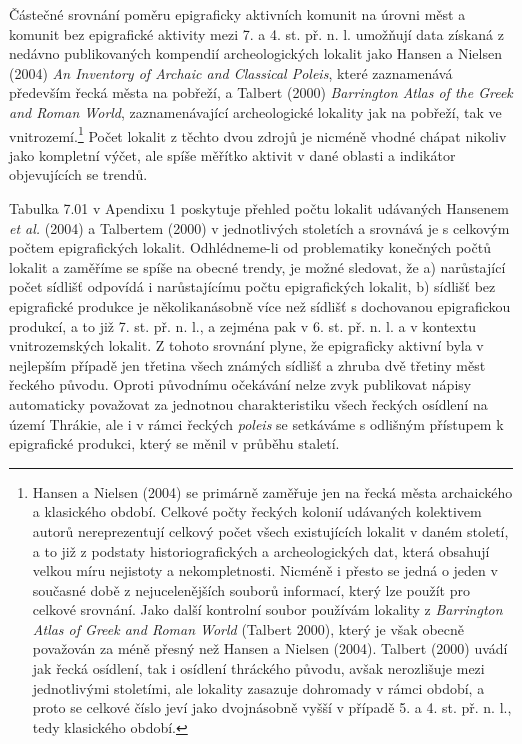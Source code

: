Částečné srovnání poměru epigraficky aktivních komunit na úrovni měst a komunit bez epigrafické aktivity mezi 7. a 4. st. př. n. l. umožňují data získaná z nedávno publikovaných kompendií archeologických lokalit jako Hansen a Nielsen (2004) {\em An Inventory of Archaic and Classical Poleis}, které zaznamenává především řecká města na pobřeží, a Talbert (2000) {\em Barrington Atlas of the Greek and Roman World}, zaznamenávající archeologické lokality jak na pobřeží, tak ve vnitrozemí.\footnote{Hansen a Nielsen (2004) se primárně zaměřuje jen na řecká města archaického a klasického období. Celkové počty řeckých kolonií udávaných kolektivem autorů nereprezentují celkový počet všech existujících lokalit v daném století, a to již z podstaty historiografických a archeologických dat, která obsahují velkou míru nejistoty a nekompletnosti. Nicméně i přesto se jedná o jeden v současné době z nejucelenějších souborů informací, který lze použít pro celkové srovnání. Jako další kontrolní soubor používám lokality z {\em Barrington Atlas of Greek and Roman World} (Talbert 2000), který je však obecně považován za méně přesný než Hansen a Nielsen (2004). Talbert (2000) uvádí jak řecká osídlení, tak i osídlení thráckého původu, avšak nerozlišuje mezi jednotlivými stoletími, ale lokality zasazuje dohromady v rámci období, a proto se celkové číslo jeví jako dvojnásobně vyšší v případě 5. a 4. st. př. n. l., tedy klasického období.} Počet lokalit z těchto dvou zdrojů je nicméně vhodné chápat nikoliv jako kompletní výčet, ale spíše měřítko aktivit v dané oblasti a indikátor objevujících se trendů.

Tabulka 7.01 v Apendixu 1 poskytuje přehled počtu lokalit udávaných Hansenem {\em et al.} (2004) a Talbertem (2000) v jednotlivých stoletích a srovnává je s celkovým počtem epigrafických lokalit. Odhlédneme-li od problematiky konečných počtů lokalit a zaměříme se spíše na obecné trendy, je možné sledovat, že a) narůstající počet sídlišť odpovídá i narůstajícímu počtu epigrafických lokalit, b) sídlišť bez epigrafické produkce je několikanásobně více než sídlišť s dochovanou epigrafickou produkcí, a to již 7. st. př. n. l., a zejména pak v 6. st. př. n. l. a v kontextu vnitrozemských lokalit. Z tohoto srovnání plyne, že epigraficky aktivní byla v nejlepším případě jen třetina všech známých sídlišť a zhruba dvě třetiny měst řeckého původu. Oproti původnímu očekávání nelze zvyk publikovat nápisy automaticky považovat za jednotnou charakteristiku všech řeckých osídlení na území Thrákie, ale i v rámci řeckých {\em poleis} se setkáváme s odlišným přístupem k epigrafické produkci, který se měnil v průběhu staletí.

